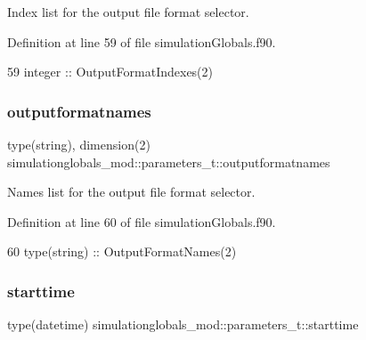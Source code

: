 Index list for the output file format selector. 



Definition at line 59 of file simulation\+Globals.\+f90.


\begin{DoxyCode}
59         \textcolor{keywordtype}{integer}         :: OutputFormatIndexes(2)
\end{DoxyCode}
\mbox{\label{structsimulationglobals__mod_1_1parameters__t_a75f99aae482ed1092b84b5bbff494d99}} 
\subsubsection{\texorpdfstring{outputformatnames}{outputformatnames}}
{\footnotesize\ttfamily type(string), dimension(2) simulationglobals\+\_\+mod\+::parameters\+\_\+t\+::outputformatnames\hspace{0.3cm}{\ttfamily [private]}}



Names list for the output file format selector. 



Definition at line 60 of file simulation\+Globals.\+f90.


\begin{DoxyCode}
60         \textcolor{keywordtype}{type}(string)    :: OutputFormatNames(2)
\end{DoxyCode}
\mbox{\label{structsimulationglobals__mod_1_1parameters__t_a204cdccb6f9cd2fa137210a7f28f676d}} 
\subsubsection{\texorpdfstring{starttime}{starttime}}
{\footnotesize\ttfamily type(datetime) simulationglobals\+\_\+mod\+::parameters\+\_\+t\+::starttime\hspace{0.3cm}{\ttfamily [private]}}



